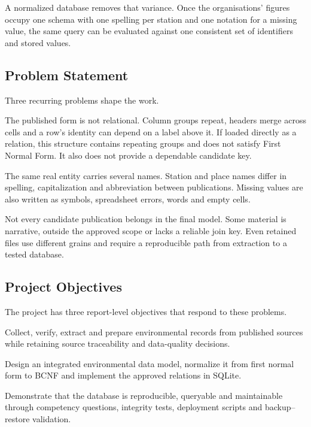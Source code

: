 A normalized database removes that variance. Once the organisations' figures
occupy one schema with one spelling per station and one notation for a missing
value, the same query can be evaluated against one consistent set of
identifiers and stored values.

\subsection{Problem Statement}
\label{subsec:ps}

Three recurring problems shape the work.

\begin{description}[leftmargin=1.15cm,style=nextline]
  \item[P1] The published form is not relational. Column groups repeat, headers
  merge across cells and a row's identity can depend on a label above it. If
  loaded directly as a relation, this structure contains repeating groups and
  does not satisfy First Normal Form. It also does not provide a dependable
  candidate key.
  \item[P2] The same real entity carries several names. Station and place names
  differ in spelling, capitalization and abbreviation between publications.
  Missing values are also written as symbols, spreadsheet errors, words and
  empty cells.
  \item[P3] Not every candidate publication belongs in the final model. Some
  material is narrative, outside the approved scope or lacks a reliable join
  key. Even retained files use different grains and require a reproducible path
  from extraction to a tested database.
\end{description}

\subsection{Project Objectives}
\label{subsec:objectives}

The project has three report-level objectives that respond to these problems.

\begin{description}[leftmargin=1.25cm,style=nextline]
  \item[OB1] Collect, verify, extract and prepare environmental records from
  published sources while retaining source traceability and data-quality
  decisions.
  \item[OB2] Design an integrated environmental data model, normalize it from
  first normal form to BCNF and implement the approved relations in SQLite.
  \item[OB3] Demonstrate that the database is reproducible, queryable and
  maintainable through competency questions, integrity tests, deployment
  scripts and backup--restore validation.
\end{description}

